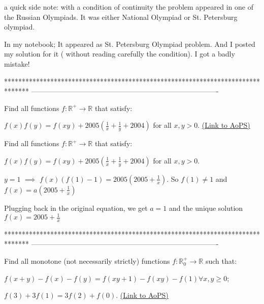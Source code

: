 \begin{solution}
	\begin{tcolorbox}a quick side note: with a condition of continuity the problem appeared in one of the Russian Olympiads. It was either National Olympiad or St. Petersburg olympiad.\end{tcolorbox}
In my notebook; It appeared as St. Petersburg Olympiad problem. And I posted my solution for it ( without reading carefully the condition). I got a badly mistake!
\end{solution}
*******************************************************************************
-------------------------------------------------------------------------------

\begin{problem}
	Find all functions $ f: \mathbb{R}^{+}\rightarrow \mathbb{R}$ that satisfy:

$ f(x)f(y)=f(xy)+2005 \left( \frac{1}{x}+\frac{1}{y}+2004 \right)$ for all $ x,y>0.$
	\flushright \href{https://artofproblemsolving.com/community/c6h291916}{(Link to AoPS)}
\end{problem}



\begin{solution}
	\begin{tcolorbox}Find all functions $ f: \mathbb{R}^{ + }\rightarrow \mathbb{R}$ that satisfy:

$ f(x)f(y) = f(xy) + 2005 \left( \frac {1}{x} + \frac {1}{y} + 2004 \right)$ for all $ x,y > 0.$\end{tcolorbox}

$ y=1$ $ \implies$ $ f(x)(f(1)-1)=2005(2005+\frac 1x)$. So $ f(1)\neq 1$ and $ f(x)=a(2005+\frac 1x)$

Plugging back in the original equation, we get $ a=1$ and the unique solution $ \boxed{f(x)=2005+\frac 1x}$
\end{solution}
*******************************************************************************
-------------------------------------------------------------------------------

\begin{problem}
	Find all monotone (not necessarily strictly) functions $ f: \mathbb{R}^{+}_0\rightarrow \mathbb{R}$ such that:

$ f(x+y)-f(x)-f(y)=f(xy+1)-f(xy)-f(1) \forall x,y \ge 0$;

$ f(3)+3f(1)=3f(2)+f(0).$
	\flushright \href{https://artofproblemsolving.com/community/c6h291928}{(Link to AoPS)}
\end{problem}




